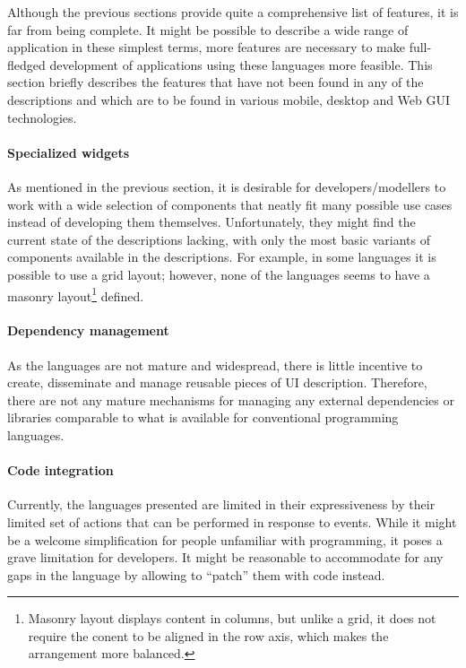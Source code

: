 
Although the previous sections provide quite a comprehensive list of features, it is far from being complete.
It might be possible to describe a wide range of application in these simplest terms, more features are necessary to make full-fledged development of applications using these languages more feasible.
This section briefly describes the features that have not been found in any of the descriptions and which are to be found in various mobile, desktop and Web GUI technologies.

\paragraph{Specialized widgets}
As mentioned in the previous section, it is desirable for developers/modellers to work with a wide selection of components that neatly fit many possible use cases instead of developing them themselves.
Unfortunately, they might find the current state of the descriptions lacking, with only the most basic variants of components available in the descriptions.
For example, in some languages it is possible to use a grid layout;
however, none of the languages seems to have a masonry layout\footnote{Masonry layout displays content in columns, but unlike a grid, it does not require the conent to be aligned in the row axis, which makes the arrangement more balanced.} defined.



\paragraph{Dependency management}
As the languages are not mature and widespread, there is little incentive to create, disseminate and manage reusable pieces of UI description.
Therefore, there are not any mature mechanisms for managing any external dependencies or libraries comparable to what is available for conventional programming languages.

\paragraph{Code integration}
Currently, the languages presented are limited in their expressiveness by their limited set of actions that can be performed in response to events.
While it might be a welcome simplification for people unfamiliar with programming, it poses a grave limitation for developers.
It might be reasonable to accommodate for any gaps in the language by allowing to \enquote{patch} them with code instead.

